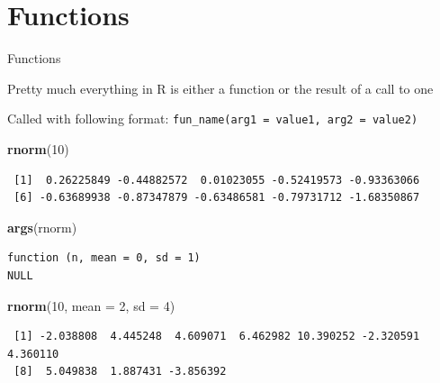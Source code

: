 \documentclass[10pt,ignorenonframetext,compress, aspectratio=169]{beamer}
\newenvironment{Shaded}{\begin{snugshade}}{\end{snugshade}}
\newcommand{\KeywordTok}[1]{\textcolor[rgb]{0.13,0.29,0.53}{\textbf{{#1}}}}
\newcommand{\DataTypeTok}[1]{\textcolor[rgb]{0.13,0.29,0.53}{{#1}}}
\newcommand{\DecValTok}[1]{\textcolor[rgb]{0.00,0.00,0.81}{{#1}}}
\newcommand{\NormalTok}[1]{{#1}}
\begin{document}
\section{Functions}\label{functions}

\begin{frame}[fragile]{Functions}

Pretty much everything in R is either a \alert{function} or the result
of a call to one

Called with following format:
\texttt{fun\_name(arg1 = value1, arg2 = value2)}

\scriptsize

\begin{Shaded}
\begin{Highlighting}[]
\KeywordTok{rnorm}\NormalTok{(}\DecValTok{10}\NormalTok{)}
\end{Highlighting}
\end{Shaded}

\begin{verbatim}
 [1]  0.26225849 -0.44882572  0.01023055 -0.52419573 -0.93363066
 [6] -0.63689938 -0.87347879 -0.63486581 -0.79731712 -1.68350867
\end{verbatim}

\begin{Shaded}
\begin{Highlighting}[]
\KeywordTok{args}\NormalTok{(rnorm)}
\end{Highlighting}
\end{Shaded}

\begin{verbatim}
function (n, mean = 0, sd = 1) 
NULL
\end{verbatim}

\begin{Shaded}
\begin{Highlighting}[]
\KeywordTok{rnorm}\NormalTok{(}\DecValTok{10}\NormalTok{, }\DataTypeTok{mean =} \DecValTok{2}\NormalTok{, }\DataTypeTok{sd =} \DecValTok{4}\NormalTok{)}
\end{Highlighting}
\end{Shaded}

\begin{verbatim}
 [1] -2.038808  4.445248  4.609071  6.462982 10.390252 -2.320591  4.360110
 [8]  5.049838  1.887431 -3.856392
\end{verbatim}

\end{frame}
\end{document}
